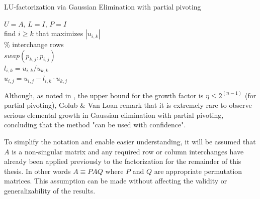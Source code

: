 \begin{algorithm}[h]
  \caption{LU-factorization via Gaussian Elimination with partial pivoting}
  \label{alg:lu_pivoting}
  \SetAlgoLined
  $U=A$, $L=I$, $P=I$ \\
   {
    find $i \geq k $ that maximizes $|u_{i,k}|$\\
    \% interchange rows \\ 
     {
      $swap(p_{k,j}, p_{i,j})$\\
    }
     {
      $l_{i, k} = u_{i, k} / u_{k, k}$ \\
       {
        $u_{i, j} = u_{i, j} - l_{i, k} \cdot u_{k,j}$
      }
    }
  }
\end{algorithm}

\noindent Although, as noted in \cite{higham_accuracy_2002}, the upper bound for the growth factor is $\eta \leq 2^{(n-1)}$ (for partial pivoting), Golub \& Van Loan \cite{golub_matrix_2013} remark that it is extremely rare to observe serious elemental growth in Gaussian elimination with partial pivoting, concluding that the method "can be used with confidence".

To simplify the notation and enable easier understanding, it will be assumed that $A$ is a non-singular matrix and any required row or column interchanges have already been applied previously to the factorization for the remainder of this thesis. In other words $A\equiv PAQ$ where $P$ and $Q$ are appropriate permutation matrices. This assumption can be made without affecting the validity or generalizability of the results.